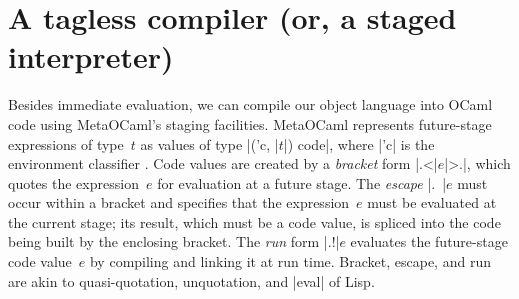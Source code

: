 \begin{comment}
\begin{code}
module EX1(S: Symantics) = struct
 open S
 let tfix () = app (fix (fun self -> self)) (int 1)
end;;
let module E =EX1(R) in E.tfix ();;
let module E =EX1(L) in E.tfix ();;
\end{code}
\end{comment}

\section{A tagless compiler (or, a staged interpreter)}\label{S:compiler}

Besides immediate evaluation, we can compile our object language
into OCaml code using MetaOCaml's staging facilities. MetaOCaml
represents future-stage expressions of type~$t$
as values of type |('c, |$t$|) code|, where |'c| is the
environment classifier \citep{WalidPOPL03,calcagno-ml-like}. Code values are created
by a \emph{bracket} form |.<|$e$|>.|, which quotes the expression~$e$ for
evaluation at a future stage. The \emph{escape} |.~|$e$ must occur
within a bracket and specifies that the expression~$e$ must be evaluated
at the current stage; its result, which must be a code value, is
spliced into the code being built by the enclosing bracket. The \emph{run} form |.!|$e$ evaluates
the future-stage code value~$e$ by compiling and linking it at run time.
Bracket, escape, and run are akin to
quasi-quotation, unquotation, and |eval| of Lisp.

